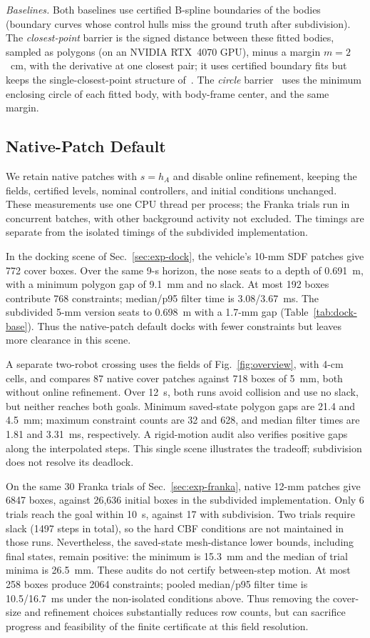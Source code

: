 \documentclass[journal]{IEEEtran}
\theoremstyle{definition}
\begin{document}
\emph{Baselines.} Both baselines use certified B-spline boundaries of the bodies~\cite{jo2027semantic}
(boundary curves whose control hulls miss the ground truth after subdivision). The \emph{closest-point}
barrier is the signed distance between these fitted bodies, sampled as polygons (on an NVIDIA RTX~4070
GPU), minus a margin $m=2$~cm, with the derivative at one closest pair; it uses certified boundary
fits but keeps the single-closest-point structure of~\cite{jo2026geometry}. The \emph{circle}
barrier~\cite{wang2017safety} uses the minimum enclosing circle of each fitted body, with body-frame
center, and the same margin.

\subsection{Native-Patch Default}\label{sec:native}
We retain native patches with $s=h_A$ and disable online refinement, keeping the fields,
certified levels, nominal controllers, and initial conditions unchanged. These measurements use
one CPU thread per process; the Franka trials run in concurrent batches, with other background
activity not excluded. The timings are separate from the isolated timings
of the subdivided implementation.

In the docking scene of Sec.~\ref{sec:exp-dock}, the vehicle's 10-mm SDF patches give 772 cover
boxes. Over the same 9-s horizon, the nose seats to a depth of 0.691~m, with a minimum polygon gap
of 9.1~mm and no slack. At most 192 boxes contribute 768 constraints; median/p95 filter time is
3.08/3.67~ms. The subdivided 5-mm version seats to 0.698~m with a 1.7-mm gap
(Table~\ref{tab:dock-base}). Thus the native-patch default docks with fewer constraints but leaves
more clearance in this scene.

A separate two-robot crossing uses the fields of Fig.~\ref{fig:overview}, with 4-cm cells,
and compares 87 native cover patches against 718 boxes of 5~mm, both without online refinement.
Over 12~s, both runs avoid collision and use no slack, but neither reaches both goals.
Minimum saved-state polygon gaps are 21.4 and 4.5~mm; maximum constraint counts are 32 and 628,
and median filter times are 1.81 and 3.31~ms, respectively. A rigid-motion audit also verifies
positive gaps along the interpolated steps. This single scene illustrates the tradeoff;
subdivision does not resolve its deadlock.

On the same 30 Franka trials of Sec.~\ref{sec:exp-franka}, native 12-mm patches give 6847 boxes,
against 26{,}636 initial boxes in the subdivided implementation. Only 6 trials reach the goal
within 10~s, against 17 with subdivision. Two trials require slack (1497 steps in total), so the
hard CBF conditions are not maintained in those runs. Nevertheless, the saved-state mesh-distance
lower bounds, including final states, remain positive: the minimum is 15.3~mm and the median of
trial minima is 26.5~mm. These audits do not certify between-step motion. At most 258 boxes produce
2064 constraints; pooled median/p95 filter time is 10.5/16.7~ms under the non-isolated conditions
above. Thus removing the cover-size and refinement choices substantially reduces row counts, but
can sacrifice progress and feasibility of the finite certificate at this field resolution.
\end{document}
